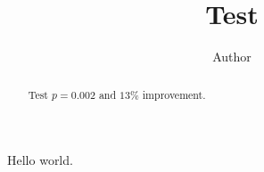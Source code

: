 \documentclass[conference]{IEEEtran}
\begin{document}
\title{Test}
\author{Author}
\maketitle
\begin{abstract}
Test $p = 0.002$ and $13\%$ improvement.
\end{abstract}
Hello world.
\end{document}
